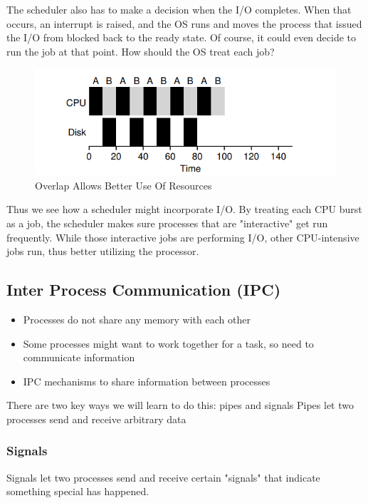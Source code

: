 \documentclass{article}
\begin{document}
The scheduler also has to make a decision when the I/O completes. When that occurs, an interrupt is raised, and the OS runs and moves the process that issued the I/O from blocked back to the ready state. Of course, it could even decide to run the job at that point. How should the
OS treat each job?

\begin{figure}[H]
        \centering
        \includegraphics[width=0.6\linewidth]{image/io2.png}
        \caption{Overlap Allows Better Use Of Resources}
\end{figure}
Thus we see how a scheduler might incorporate I/O. By treating each CPU burst as a job, the scheduler makes sure processes that are "interactive" get run frequently. While those interactive jobs are performing I/O, other CPU-intensive jobs run, thus better utilizing the processor.

\subsection{Inter Process Communication (IPC)}
\begin{itemize}
    \item Processes do not share any memory with each other
    \item Some processes might want to work together for a task, so need to communicate information
    \item IPC mechanisms to share information between processes
\end{itemize}
There are two key ways we will learn to do this: pipes and signals
Pipes let two processes send and receive arbitrary data


\subsubsection{Signals}
Signals let two processes send and receive certain "signals" that indicate something special has happened.
\end{document}
